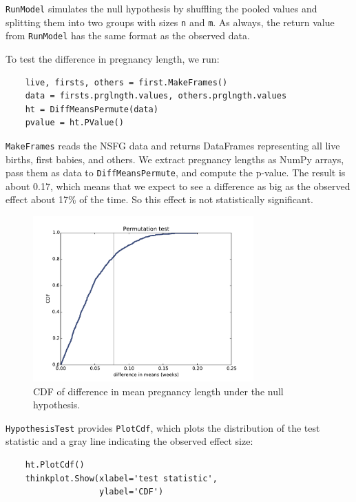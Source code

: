 \documentclass[12pt]{book}
\begin{document}
{\tt RunModel} simulates the null hypothesis by shuffling the
pooled values and splitting them into two groups with sizes {\tt n}
and {\tt m}.  As always, the return value from {\tt RunModel} has
the same format as the observed data.

To test the difference in pregnancy length, we run:

\begin{verbatim}
    live, firsts, others = first.MakeFrames()
    data = firsts.prglngth.values, others.prglngth.values
    ht = DiffMeansPermute(data)
    pvalue = ht.PValue()
\end{verbatim}

{\tt MakeFrames} reads the NSFG data and returns DataFrames
representing all live births, first babies, and others.
We extract pregnancy lengths as NumPy arrays, pass them as
data to {\tt DiffMeansPermute}, and compute the p-value.  The
result is about 0.17, which means that we expect to see a difference
as big as the observed effect about 17\% of the time.  So
this effect is not statistically significant.
   

\begin{figure}
\centerline{\includegraphics[height=2.5in]{figs/hypothesis1.pdf}}
\caption{CDF of difference in mean pregnancy length under the null
hypothesis.}
\label{hypothesis1}
\end{figure}

{\tt HypothesisTest} provides {\tt PlotCdf}, which plots the
distribution of the test statistic and a gray line indicating
the observed effect size:

\begin{verbatim}
    ht.PlotCdf()
    thinkplot.Show(xlabel='test statistic',
                   ylabel='CDF')
\end{verbatim}
\end{document}
